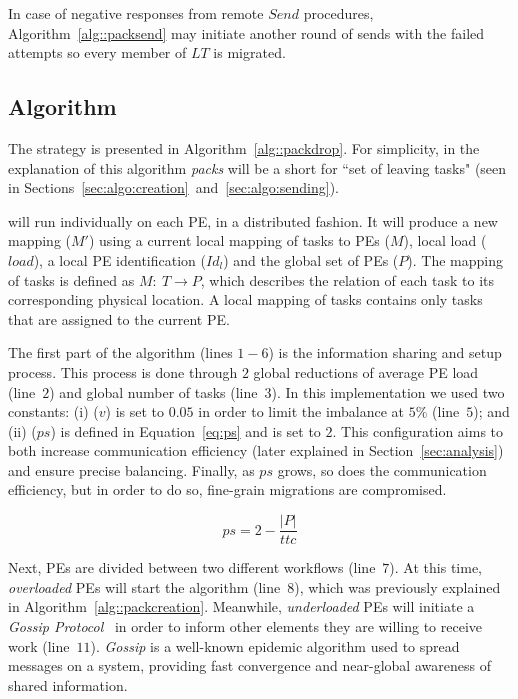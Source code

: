 In case of negative responses from remote $Send$ procedures, Algorithm~\ref{alg::packsend} may initiate another round of sends with the failed attempts so every member of $LT$ is migrated.

\subsection{\packdrop Algorithm} \label{sec:algo:main}

The \packdrop strategy is presented in Algorithm~\ref{alg::packdrop}.
For simplicity, in the explanation of this algorithm \textit{packs} will be a short for ``set of leaving tasks" (seen in Sections~\ref{sec:algo:creation}~and~\ref{sec:algo:sending}).

\packdrop will run individually on each PE, in a distributed fashion. 
It will produce a new mapping ($M'$) using a current local mapping of tasks to PEs ($M$), local load ($load$), a local PE identification ($Id_l$) and the global set of PEs ($P$).
The mapping of tasks is defined as $M:\ T \rightarrow P$, which describes the relation of each task to its corresponding physical location.
A local mapping of tasks contains only tasks that are assigned to the current PE.

The first part of the algorithm (lines $1-6$) is the information sharing and setup process. 
This process is done through $2$ global reductions of average PE load (line~$2$) and global number of tasks (line~$3$).
In this implementation we used two constants: (i) ($v$) is set to $0.05$ in order to limit the imbalance at $5\%$ (line~$5$); and (ii) ($ps$) is defined in Equation~\ref{eq:ps} and is set to $2$.
This configuration aims to both increase communication efficiency (later explained in Section~\ref{sec:analysis}) and ensure precise balancing.
Finally, as $ps$ grows, so does the communication efficiency, but in order to do so, fine-grain migrations are compromised.

\begin{equation}
	ps = 2-\frac{|P|}{ttc}
	\label{eq:ps}
\end{equation}

Next, PEs are divided between two different workflows (line~$7$).
At this time, \textit{overloaded} PEs will start the \batchassembly algorithm (line~$8$), which was previously explained in Algorithm~\ref{alg::packcreation}.
Meanwhile, \textit{underloaded} PEs will initiate a \textit{Gossip Protocol}~\cite{gossip} in order to inform other elements they are willing to receive work (line~$11$).
\textit{Gossip} is a well-known epidemic algorithm used to spread messages on a system, providing fast convergence and near-global awareness of shared information.

